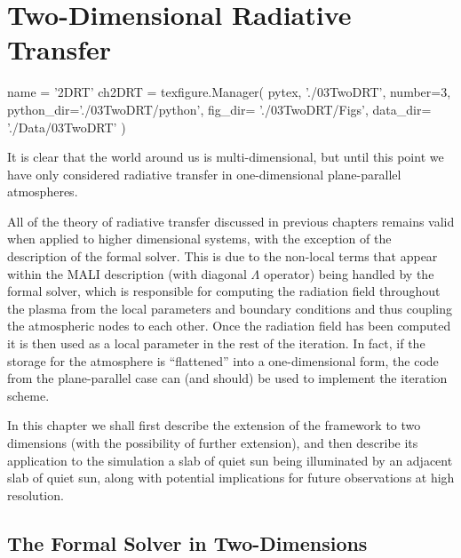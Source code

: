 \chapter{Two-Dimensional Radiative Transfer}\label{Chap:2DRT}
\begin{pycode}[2DRT]
name = '2DRT'
ch2DRT = texfigure.Manager(
    pytex,
    './03TwoDRT',
    number=3,
    python_dir='./03TwoDRT/python',
    fig_dir=   './03TwoDRT/Figs',
    data_dir=  './Data/03TwoDRT'
)
\end{pycode}


It is clear that the world around us is multi-dimensional, but until this point we have only considered radiative transfer in one-dimensional plane-parallel atmospheres.

All of the theory of radiative transfer discussed in previous chapters remains valid when applied to higher dimensional systems, with the exception of the description of the formal solver.
This is due to the non-local terms that appear within the MALI description (with diagonal $\Lambda$ operator) being handled by the formal solver, which is responsible for computing the radiation field throughout the plasma from the local parameters and boundary conditions and thus coupling the atmospheric nodes to each other.
Once the radiation field has been computed it is then used as a local parameter in the rest of the iteration.
In fact, if the storage for the atmosphere is ``flattened'' into a one-dimensional form, the code from the plane-parallel case can (and should) be used to implement the iteration scheme.

In this chapter we shall first describe the extension of the \Lw{} framework to two dimensions (with the possibility of further extension), and then describe its application to the simulation a slab of quiet sun being illuminated by an adjacent slab of quiet sun, along with potential implications for future observations at high resolution.

\section{The Formal Solver in Two-Dimensions}\label{Sec:2DFS}

